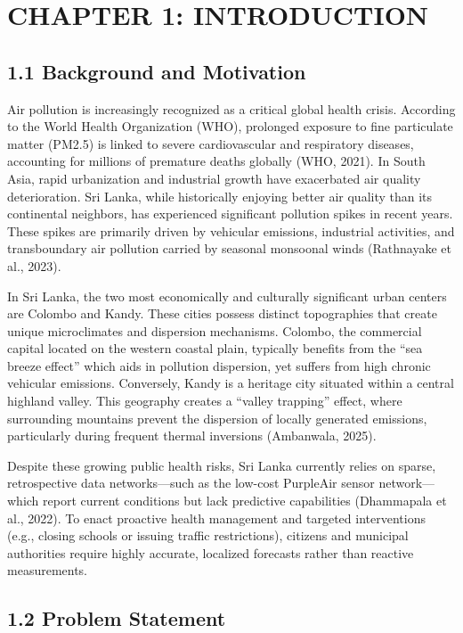 \chapter{CHAPTER 1: INTRODUCTION}\label{chapter-1-introduction}

\section{1.1 Background and Motivation}\label{background-and-motivation}

Air pollution is increasingly recognized as a critical global health
crisis. According to the World Health Organization (WHO), prolonged
exposure to fine particulate matter (PM2.5) is linked to severe
cardiovascular and respiratory diseases, accounting for millions of
premature deaths globally (WHO, 2021). In South Asia, rapid urbanization
and industrial growth have exacerbated air quality deterioration. Sri
Lanka, while historically enjoying better air quality than its
continental neighbors, has experienced significant pollution spikes in
recent years. These spikes are primarily driven by vehicular emissions,
industrial activities, and transboundary air pollution carried by
seasonal monsoonal winds (Rathnayake et al., 2023).

In Sri Lanka, the two most economically and culturally significant urban
centers are Colombo and Kandy. These cities possess distinct
topographies that create unique microclimates and dispersion mechanisms.
Colombo, the commercial capital located on the western coastal plain,
typically benefits from the ``sea breeze effect'' which aids in
pollution dispersion, yet suffers from high chronic vehicular emissions.
Conversely, Kandy is a heritage city situated within a central highland
valley. This geography creates a ``valley trapping'' effect, where
surrounding mountains prevent the dispersion of locally generated
emissions, particularly during frequent thermal inversions (Ambanwala,
2025).

Despite these growing public health risks, Sri Lanka currently relies on
sparse, retrospective data networks---such as the low-cost PurpleAir
sensor network---which report current conditions but lack predictive
capabilities (Dhammapala et al., 2022). To enact proactive health
management and targeted interventions (e.g., closing schools or issuing
traffic restrictions), citizens and municipal authorities require highly
accurate, localized forecasts rather than reactive measurements.

\section{1.2 Problem Statement}\label{problem-statement}

